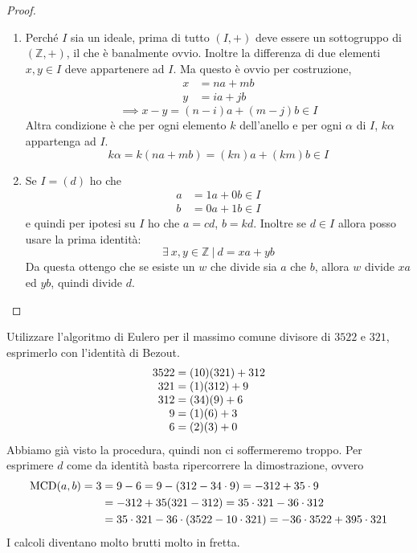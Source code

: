 \begin{proof}\
	\begin{enumerate}
		\item Perché $I$ sia un ideale, prima di tutto $(I,+)$ deve essere un sottogruppo di $(\mathbb{Z},+)$, il che è banalmente ovvio. Inoltre la differenza di due elementi $x,y \in I$ deve appartenere ad $I$. Ma questo è ovvio per costruzione,
		\begin{align*}
		x &= na+mb \\y&=ia+jb
		\end{align*}
		\begin{equation*}
		\implies x-y = (n-i)a+(m-j)b \in I
		\end{equation*}
		Altra condizione è che per ogni elemento $k$ dell'anello e per ogni $\alpha$ di $I$, $k\alpha$ appartenga ad $I$.
		\begin{equation*}
		k\alpha = k(na+mb)=(kn)a+(km)b\in I
		\end{equation*}
		\item Se $I=(d)$ ho che
		\begin{align*}
		a&=1a+0b \in I\\ b&=0a+1b \in I
		\end{align*}
		e quindi per ipotesi su $I$ ho che $a=cd$, $b=kd$. Inoltre se $d \in I$ allora posso usare la prima identità:
		\begin{equation*}
		\exists \ x,y \in \mathbb{Z} \ |\ d=xa+yb
		\end{equation*}
		Da questa ottengo che se esiste un $w$ che divide sia $a$ che $b$, allora $w$ divide $xa$ ed $yb$, quindi divide $d$. 
	\end{enumerate}
\end{proof}
\begin{esempio}
	Utilizzare l'algoritmo di Eulero per il massimo comune divisore di $3522$ e $321$, esprimerlo con l'identità di Bezout.
	\begin{equation*}
		\arraycolsep=1.4pt
		\begin{array}{rl}
			3522 &= (10)(321)+312\\
			321 &= (1)(312)+9\\
			312 &= (34)(9)+6\\
			9 &=(1)(6)+3\\
			6 &=(2)(3)+0
		\end{array}
	\end{equation*}
	Abbiamo già visto la procedura, quindi non ci soffermeremo troppo. Per esprimere $d$ come da identità basta ripercorrere la dimostrazione, ovvero 
	\begin{align*}
	\operatorname{\mathrm{MCD}}(a,b)=3&= 9-6=9-(312-34\cdot9)=-312+35\cdot9\\
	&= -312+35(321-312)=35\cdot321-36\cdot312\\
	&= 35\cdot321-36\cdot(3522-10\cdot321)=-36\cdot3522+395\cdot321
	\end{align*}
	I calcoli diventano molto brutti molto in fretta.
\end{esempio}
